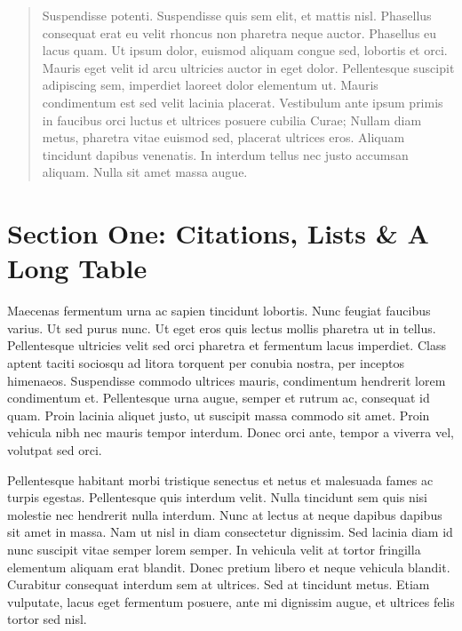 

\begin{abstract}
\noindent Suspendisse potenti. Suspendisse quis sem elit, et mattis nisl. Phasellus consequat erat eu velit rhoncus non pharetra neque auctor. Phasellus eu lacus quam. Ut ipsum dolor, euismod aliquam congue sed, lobortis et orci. Mauris eget velit id arcu ultricies auctor in eget dolor. Pellentesque suscipit adipiscing sem, imperdiet laoreet dolor elementum ut. Mauris condimentum est sed velit lacinia placerat. Vestibulum ante ipsum primis in faucibus orci luctus et ultrices posuere cubilia Curae; Nullam diam metus, pharetra vitae euismod sed, placerat ultrices eros. Aliquam tincidunt dapibus venenatis. In interdum tellus nec justo accumsan aliquam. Nulla sit amet massa augue.
\end{abstract}

\setlength\parindent{.45in} 



\doublespacing

\section*{Section One: Citations, Lists \& A Long Table}

Maecenas \cite{anderson1999} fermentum \cite{bourdieu1984} urna ac sapien tincidunt lobortis. Nunc feugiat faucibus varius. Ut sed purus nunc. Ut eget eros quis lectus mollis pharetra ut in tellus. Pellentesque ultricies velit sed orci pharetra et fermentum lacus imperdiet. Class aptent taciti sociosqu ad litora torquent per conubia nostra, per inceptos himenaeos. Suspendisse commodo ultrices mauris, condimentum hendrerit lorem condimentum et. Pellentesque urna augue, semper et rutrum ac, consequat id quam. Proin lacinia aliquet justo, ut suscipit massa commodo sit amet. Proin vehicula nibh nec mauris tempor interdum. Donec orci ante, tempor a viverra vel, volutpat sed orci. \cite{bader2007}

Pellentesque habitant morbi tristique senectus et netus et malesuada fames ac turpis egestas. \cite{coleman1990} Pellentesque quis interdum velit. Nulla tincidunt sem quis nisi molestie nec hendrerit nulla interdum. Nunc at lectus at neque dapibus dapibus sit amet in massa. Nam ut nisl in diam consectetur dignissim. Sed lacinia diam id nunc suscipit vitae semper lorem semper. In vehicula velit at tortor fringilla elementum aliquam erat blandit. \cite{dimaggio1983} Donec pretium libero et neque vehicula blandit. Curabitur consequat interdum sem at ultrices. Sed at tincidunt metus. Etiam vulputate, lacus eget fermentum posuere, ante mi dignissim augue, et ultrices felis tortor sed nisl. \cite{giddens1991}

